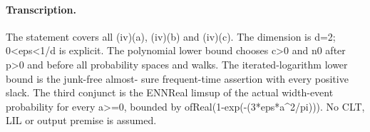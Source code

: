\paragraph{Transcription.}
The statement covers all (iv)(a), (iv)(b) and (iv)(c). The dimension is d=2; 0<eps<1/d is explicit. The polynomial lower bound chooses c>0 and n0 after p>0 and before all probability spaces and walks. The iterated-logarithm lower bound is the junk-free almost- sure frequent-time assertion with every positive slack. The third conjunct is the ENNReal limsup of the actual width-event probability for every a>=0, bounded by ofReal(1-exp(-(3*eps*a^2/pi))). No CLT, LIL or output premise is assumed. 

